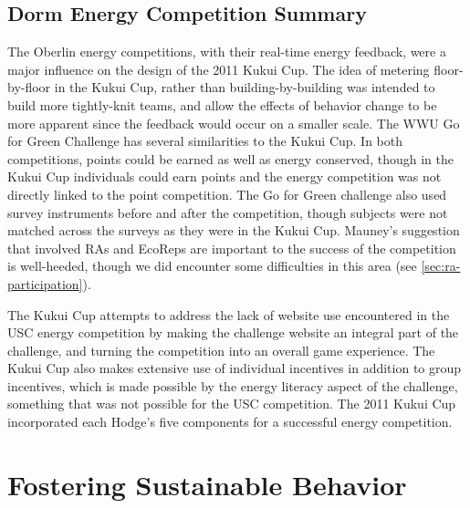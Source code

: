 \subsection{Dorm Energy Competition Summary}

The Oberlin energy competitions, with their real-time energy feedback, were a major influence on the design of the 2011 Kukui Cup. The idea of metering floor-by-floor in the Kukui Cup, rather than building-by-building was intended to build more tightly-knit teams, and allow the effects of behavior change to be more apparent since the feedback would occur on a smaller scale. The WWU Go for Green Challenge has several similarities to the Kukui Cup. In both competitions, points could be earned as well as energy conserved, though in the Kukui Cup individuals could earn points and the energy competition was not directly linked to the point competition. The Go for Green challenge also used survey instruments before and after the competition, though subjects were not matched across the surveys as they were in the Kukui Cup. Mauney's suggestion that involved RAs and EcoReps are important to the success of the competition is well-heeded, though we did encounter some difficulties in this area (see \autoref{sec:ra-participation}).

The Kukui Cup attempts to address the lack of website use encountered in the USC energy competition by making the challenge website an integral part of the challenge, and turning the competition into an overall game experience. The Kukui Cup also makes extensive use of individual incentives in addition to group incentives, which is made possible by the energy literacy aspect of the challenge, something that was not possible for the USC competition. The 2011 Kukui Cup incorporated each Hodge's five components for a successful energy competition.


\section{Fostering Sustainable Behavior}
\label{sec:fostering-behavior}

